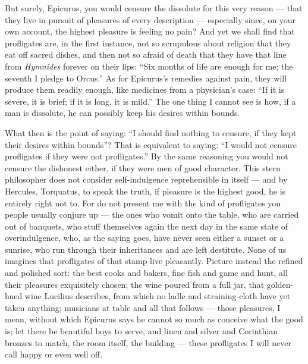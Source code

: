 But surely, Epicurus, you would censure the dissolute for this very reason — that they live in pursuit of pleasures of every description — especially since, on your own account, the highest pleasure is feeling no pain? And yet we shall find that profligates are, in the first instance, not so scrupulous about religion that they eat off sacred dishes, and then not so afraid of death that they have that line from \textit{Hymnides} forever on their lips: ``Six months of life are enough for me; the seventh I pledge to Orcus.'' As for Epicurus's remedies against pain, they will produce them readily enough, like medicines from a physician's case: ``If it is severe, it is brief; if it is long, it is mild.'' The one thing I cannot see is how, if a man is dissolute, he can possibly keep his desires within bounds.

What then is the point of saying: ``I should find nothing to censure, if they kept their desires within bounds''? That is equivalent to saying: ``I would not censure profligates if they were not profligates.'' By the same reasoning you would not censure the dishonest either, if they were men of good character. This stern philosopher does not consider self-indulgence reprehensible in itself — and by Hercules, Torquatus, to speak the truth, if pleasure is the highest good, he is entirely right not to. For do not present me with the kind of profligates you people usually conjure up — the ones who vomit onto the table, who are carried out of banquets, who stuff themselves again the next day in the same state of overindulgence, who, as the saying goes, have never seen either a sunset or a sunrise, who run through their inheritances and are left destitute. None of us imagines that profligates of that stamp live pleasantly. Picture instead the refined and polished sort: the best cooks and bakers, fine fish and game and hunt, all their pleasures exquisitely chosen; the wine poured from a full jar, that golden-hued wine Lucilius describes, from which no ladle and straining-cloth have yet taken anything; musicians at table and all that follows — those pleasures, I mean, without which Epicurus says he cannot so much as conceive what the good is; let there be beautiful boys to serve, and linen and silver and Corinthian bronzes to match, the room itself, the building — these profligates I will never call happy or even well off.

